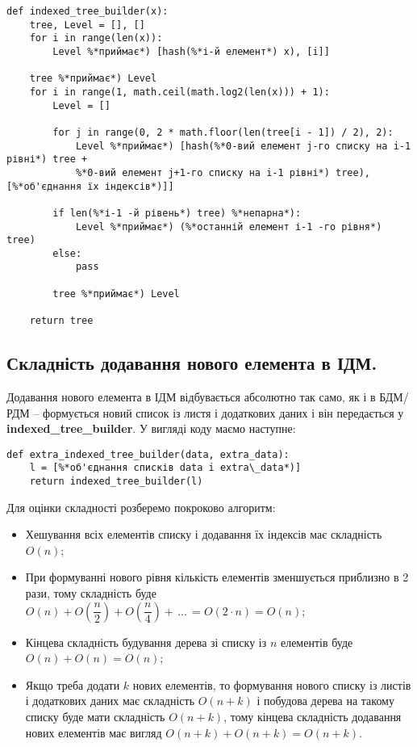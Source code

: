 \documentclass[a4paper, 12pt]{article}
\begin{document}
\begin{lstlisting}
def indexed_tree_builder(x):
    tree, Level = [], []
    for i in range(len(x)):
        Level %*приймає*) [hash(%*і-й елемент*) x), [i]]
    
    tree %*приймає*) Level
    for i in range(1, math.ceil(math.log2(len(x))) + 1):
        Level = []
        
        for j in range(0, 2 * math.floor(len(tree[i - 1]) / 2), 2):
            Level %*приймає*) [hash(%*0-вий елемент j-го списку на i-1 рівні*) tree + 
            %*0-вий елемент j+1-го списку на i-1 рівні*) tree), [%*об'єднання їх індексів*)]]
        
        if len(%*і-1 -й рівень*) tree) %*непарна*):
            Level %*приймає*) (%*останній елемент і-1 -го рівня*) tree)
        else:
            pass
        
        tree %*приймає*) Level

    return tree
\end{lstlisting}

\newpage

\subsection{Складність додавання нового елемента в ІДМ.}
\par Додавання нового елемента в ІДМ відбувається абсолютно так само, як і в БДМ/РДМ -- формується новий список із листя і додаткових даних і він передається у \textbf{indexed\_tree\_builder}. У вигляді коду маємо наступне:

\begin{lstlisting}
def extra_indexed_tree_builder(data, extra_data):
    l = [%*об'єднання списків data i extra\_data*)]
    return indexed_tree_builder(l)
\end{lstlisting}

\par Для оцінки складності розберемо покроково алгоритм:
\begin{itemize}
	\item Хешування всіх елементів списку і додавання їх індексів має складність $O(n)$;
	\item При формуванні нового рівня кількість елементів зменшується приблизно в 2 рази, тому складність буде $O(n) + O\left(\dfrac n2\right) + O\left(\dfrac n4\right) + \, \dots \, = O(2 \cdot n) = O(n)$;
	\item Кінцева складність будування дерева зі списку із $n$ елементів буде $O(n) + O(n) = O(n)$;
	\item Якщо треба додати $k$ нових елементів, то формування нового списку із листів і додаткових даних має складність $O(n + k)$ і побудова дерева на такому списку буде мати складність $O(n + k)$, тому кінцева складність додавання нових елементів має вигляд $O(n + k) + O(n + k) = O(n + k)$.
\end{itemize}
\end{document}
